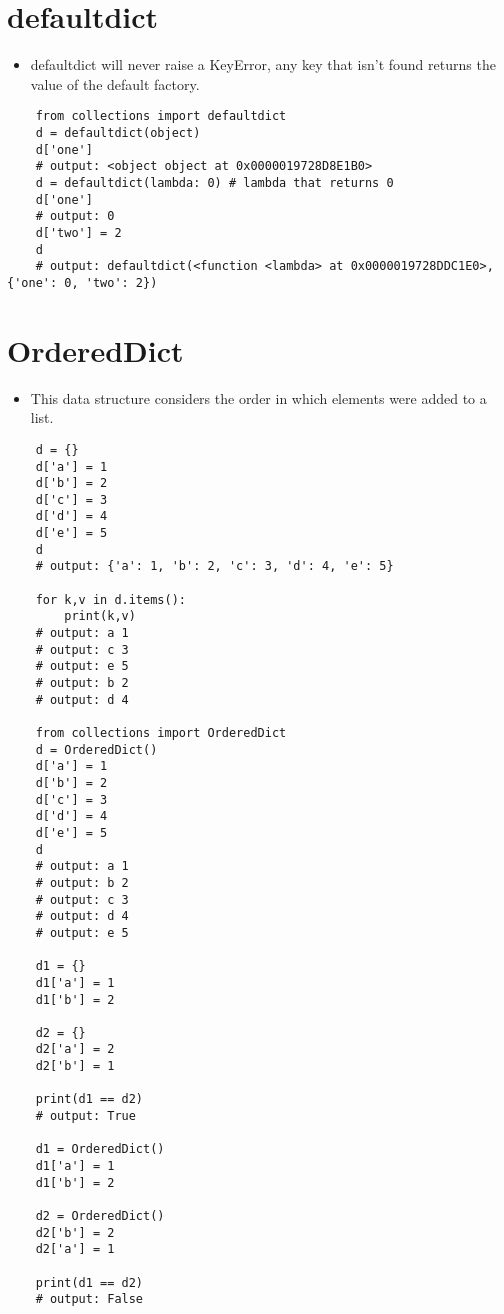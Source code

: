 \section{defaultdict}
\begin{itemize}
    \item defaultdict will never raise a KeyError, any key that isn't found returns the value of the default factory. 
\end{itemize}
\begin{verbatim}
    from collections import defaultdict
    d = defaultdict(object)
    d['one'] 
    # output: <object object at 0x0000019728D8E1B0>
    d = defaultdict(lambda: 0) # lambda that returns 0
    d['one'] 
    # output: 0
    d['two'] = 2
    d 
    # output: defaultdict(<function <lambda> at 0x0000019728DDC1E0>, {'one': 0, 'two': 2})
\end{verbatim}


\section{OrderedDict}
\begin{itemize}
    \item This data structure considers the order in which elements were added to a list. 
\end{itemize}
\begin{verbatim}
    d = {}
    d['a'] = 1
    d['b'] = 2
    d['c'] = 3
    d['d'] = 4
    d['e'] = 5
    d 
    # output: {'a': 1, 'b': 2, 'c': 3, 'd': 4, 'e': 5}

    for k,v in d.items():
        print(k,v)
    # output: a 1
    # output: c 3
    # output: e 5
    # output: b 2
    # output: d 4

    from collections import OrderedDict
    d = OrderedDict()
    d['a'] = 1
    d['b'] = 2
    d['c'] = 3
    d['d'] = 4
    d['e'] = 5
    d 
    # output: a 1
    # output: b 2
    # output: c 3
    # output: d 4
    # output: e 5

    d1 = {}
    d1['a'] = 1
    d1['b'] = 2

    d2 = {}
    d2['a'] = 2
    d2['b'] = 1

    print(d1 == d2)
    # output: True

    d1 = OrderedDict()
    d1['a'] = 1
    d1['b'] = 2

    d2 = OrderedDict()
    d2['b'] = 2
    d2['a'] = 1

    print(d1 == d2)
    # output: False 
\end{verbatim}


